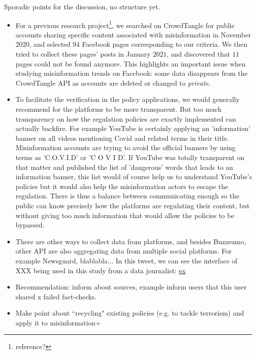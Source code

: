 \documentclass{article}
\begin{document}
{ \color{pink} 
Sporadic points for the discussion, no structure yet. 

\begin{itemize}

	\item For a previous research project\footnote{reference?}, we searched on CrowdTangle for public accounts sharing specific content associated with misinformation in November $2020$, and selected $94$ Facebook pages corresponding to our criteria. We then tried to collect these pages' posts in January $2021$, and discovered that $11$ pages could not be found anymore. This highlights an important issue when studying misinformation trends on Facebook: some data disappears from the CrowdTangle API as accounts are deleted or changed to {\it private}. 

	\item To facilitate the verification in the policy applications, we would generally recommend for the platforms to be more transparent. But too much transparency on how the regulation policies are exactly implemented can actually backfire. For example YouTube is certainly applying an 'information' banner on all videos mentioning Covid and related terms in their title. Misinformation accounts are trying to avoid the official banners by using terms as 'C.O.V.I.D' or 'C O V I D'. If YouTube was totally transparent on that matter and published the list of 'dangerous' words that leads to an information banner, this list would of course help us to understand YouTube's policies but it would also help the misinformation actors to escape the regulation. There is thus a balance between communicating enough so the public can know precisely how the platforms are regulating their content, but without giving too much information that would allow the policies to be bypassed.

	\item There are other ways to collect data from platforms, and besides Buzzsumo, other API are also aggregating data from multiple social platforms. For example Newsguard, blablabla... In this tweet, we can see the interface of XXX being used in this study from a data journalist: \href{https://twitter.com/Shayan86/status/1394742784683298818/photo/2}{ex}

	\item Recommendation: inform about sources, example inform users that this user shared x failed fact-checks. 

	\item Make point about ``recycling" existing policies (e.g. to tackle terrorism) and apply it to misinformation+


\end{itemize}}
\end{document}
